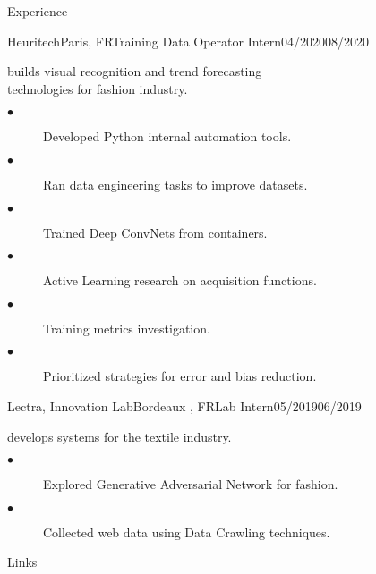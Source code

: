 \documentclass{resume}
\begin{document}
\begin{multicols}{2}
\begin{rSection}{\Large Experience}
		\begin{job}{Heuritech}{Paris, FR}{Training Data Operator Intern}{04/2020}{08/2020}{
			builds visual recognition and trend forecasting \\ technologies for fashion industry.
			\begin{description}
				\item[$\bullet$] Developed Python internal automation tools.
				\item[$\bullet$] Ran data engineering tasks to improve datasets. 
				\item[$\bullet$] Trained Deep ConvNets from containers.
				\item[$\bullet$] Active Learning research on acquisition functions.
				\item[$\bullet$] Training metrics investigation.
				\item[$\bullet$] Prioritized strategies for error and bias reduction.
			\end{description}
		}
		\end{job}
		\begin{job}{Lectra, Innovation Lab}{Bordeaux , FR}{Lab Intern}{05/2019}{06/2019}{
			develops systems for the textile industry.
			\begin{description}
				\item[$\bullet$] Explored Generative Adversarial Network for fashion.
				\item[$\bullet$] Collected web data using Data Crawling techniques.
			\end{description}
		}
		\end{job}
	\end{rSection}
	
	\columnbreak
	
	\begin{rSection}{\Large Links}
	\end{rSection}
	

\end{multicols}
\end{document}
